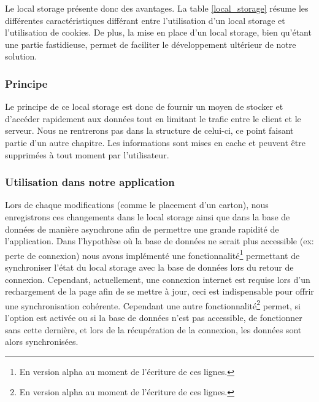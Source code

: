 



Le local storage présente donc des avantages. La table \ref{local_storage} résume les différentes caractéristiques différant entre l'utilisation d'un local storage et l'utilisation de cookies.
\newline
\indent
De plus, la mise en place d'un local storage, bien qu'étant une partie fastidieuse, permet de faciliter le développement ultérieur de notre solution.

  
\subsubsection{Principe}

Le principe de ce local storage est donc de fournir un moyen de stocker et d'accéder rapidement aux données tout en limitant le trafic entre le client et le serveur. Nous ne rentrerons pas dans la structure de celui-ci, ce point faisant partie d'un autre chapitre. Les informations sont mises en cache et peuvent être supprimées à tout moment par l'utilisateur.

\subsubsection{Utilisation dans notre application}
Lors de chaque modifications (comme le placement d'un carton), nous enregistrons ces changements dans le local storage ainsi que dans la base de données de manière asynchrone afin de permettre une grande rapidité de l'application. 
\newline
\indent
Dans l'hypothèse où la base de données ne serait plus accessible (ex: perte de connexion) nous avons implémenté une fonctionnalité\footnote{En version alpha au moment de l'écriture de ces lignes.} permettant de synchroniser l'état du local storage avec la base de données lors du retour de connexion.
\newline
\indent
Cependant, actuellement, une connexion internet est requise lors d'un rechargement de la page afin de se mettre à jour, ceci est indispensable pour offrir une synchronisation cohérente. Cependant une autre fonctionnalité\footnote{En version alpha au moment de l'écriture de ces lignes.} permet, si l'option est activée ou si la base de données n'est pas accessible, de fonctionner sans cette dernière, et lors de la récupération de la connexion, les données sont alors synchronisées.



